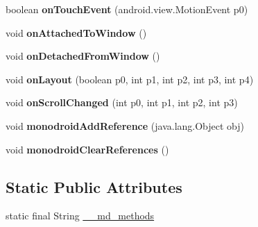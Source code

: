\begin{DoxyCompactItemize}
boolean {\bfseries on\+Touch\+Event} (android.\+view.\+Motion\+Event p0)
\item 
\mbox{\label{classmd5b60ffeb829f638581ab2bb9b1a7f4f3f_1_1_scroll_view_renderer_aa4409732485b82d3c52bafb9a6b9a8e0}} 
void {\bfseries on\+Attached\+To\+Window} ()
\item 
\mbox{\label{classmd5b60ffeb829f638581ab2bb9b1a7f4f3f_1_1_scroll_view_renderer_a3f23bcefa3f1c0eb0cef347d894aac67}} 
void {\bfseries on\+Detached\+From\+Window} ()
\item 
\mbox{\label{classmd5b60ffeb829f638581ab2bb9b1a7f4f3f_1_1_scroll_view_renderer_a3d67ff8055c54f0f7e8b83c02e1f3e5b}} 
void {\bfseries on\+Layout} (boolean p0, int p1, int p2, int p3, int p4)
\item 
\mbox{\label{classmd5b60ffeb829f638581ab2bb9b1a7f4f3f_1_1_scroll_view_renderer_a75785a2000e6b0bdede6664ea1ab230c}} 
void {\bfseries on\+Scroll\+Changed} (int p0, int p1, int p2, int p3)
\item 
\mbox{\label{classmd5b60ffeb829f638581ab2bb9b1a7f4f3f_1_1_scroll_view_renderer_af8ce9ea3774616bef86ff56598273b4f}} 
void {\bfseries monodroid\+Add\+Reference} (java.\+lang.\+Object obj)
\item 
\mbox{\label{classmd5b60ffeb829f638581ab2bb9b1a7f4f3f_1_1_scroll_view_renderer_aade95cf62b886c7d7630bd6d29119ed1}} 
void {\bfseries monodroid\+Clear\+References} ()
\end{DoxyCompactItemize}
\subsection*{Static Public Attributes}
\begin{DoxyCompactItemize}
\item 
static final String \hyperlink{classmd5b60ffeb829f638581ab2bb9b1a7f4f3f_1_1_scroll_view_renderer_ab2b998afe39872cdd0f9f5caea97ed1c}{\+\_\+\+\_\+md\+\_\+methods}
\end{DoxyCompactItemize}


